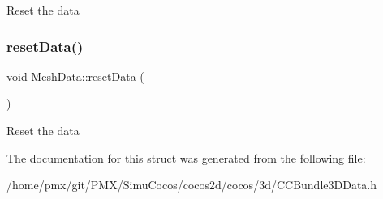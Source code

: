 Reset the data \mbox{\label{structMeshData_adea2eaa8437f832a94e288862087845b}} 
\subsubsection{\texorpdfstring{reset\+Data()}{resetData()}\hspace{0.1cm}{\footnotesize\ttfamily [2/2]}}
{\footnotesize\ttfamily void Mesh\+Data\+::reset\+Data (\begin{DoxyParamCaption}{ }\end{DoxyParamCaption})\hspace{0.3cm}{\ttfamily [inline]}}

Reset the data 

The documentation for this struct was generated from the following file\+:\begin{DoxyCompactItemize}
\item 
/home/pmx/git/\+P\+M\+X/\+Simu\+Cocos/cocos2d/cocos/3d/C\+C\+Bundle3\+D\+Data.\+h\end{DoxyCompactItemize}
